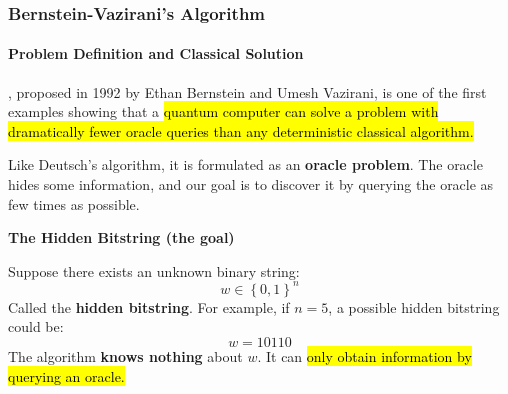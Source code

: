 \subsubsection{Bernstein-Vazirani's Algorithm}\label{sec:bernstein-vazirani-algorithm}

\paragraph{Problem Definition and Classical Solution}\label{sec:bernstein-vazirani-algorithm-problem-definition-and-classical-solution}

, proposed in 1992 by Ethan Bernstein and Umesh Vazirani, is one of the first examples showing that a \hl{quantum computer can solve a problem with dramatically fewer oracle queries than any deterministic classical algorithm.}

\highspace
Like Deutsch's algorithm, it is formulated as an \textbf{oracle problem}. The oracle hides some information, and our goal is to discover it by querying the oracle as few times as possible.

\highspace
\begin{flushleft}
    \textcolor{Green3}{ \textbf{The Hidden Bitstring (the goal)}}
\end{flushleft}
Suppose there exists an unknown binary string:
\begin{equation*}
    w \in \left\{0,1\right\}^{n}
\end{equation*}
Called the \textbf{hidden bitstring}. For example, if $n=5$, a possible hidden bitstring could be:
\begin{equation*}
    w = 10110
\end{equation*}
The algorithm \textbf{knows nothing} about $w$. It can \hl{only obtain information by querying an oracle.}

